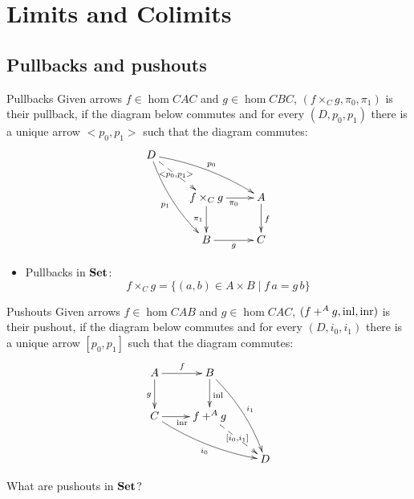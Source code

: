 \documentclass[handout]{beamer}
\begin{document}

\section{Limits and Colimits}

\subsection{Pullbacks and pushouts}

\begin{frame}{}
  \begin{block}{Pullbacks}
    Given arrows $f \in \hom{C}{A}{C}$ and $g \in \hom{C}{B}{C}$,
  $(f\times_C g,\pi_0,\pi_1)$ is their pullback, if 
  the diagram below commutes and for every $(D,p_0,p_1)$ there
  is a unique arrow $<p_0,p_1>$ such that the diagram commutes:
  \[\xymatrix{
    D \ar@/_/[ddr]_{p_1} \ar@/^/[drr]^{p_0} 
    \ar@{-->}[dr] |(.45){<p_0,p_1>} \\ 
    & f \times_C g \ar[r]_{\pi_0}\ar[d]_{\pi_1} & A \ar[d]^f \\
    & B \ar[r]_g & C}\]
  \end{block}

  \begin{itemize}
  \item Pullbacks in $\mathbf{Set}$:
    \[ f \times_C g = \{ (a,b) \in A\times B \mid f\,a = g\,b \}\]
  \end{itemize}

\end{frame}



\begin{frame}{}
  \begin{block}{Pushouts}
    Given arrows $f \in \hom{C}{A}{B}$ and $g \in \hom{C}{A}{C}$,
    $(f+^A g,\mathrm{inl},\mathrm{inr})$ is their pushout, if 
    the diagram below commutes and for every $(D,i_0,i_1)$ there
    is a unique arrow $[p_0,p_1]$ such that the diagram commutes:
    \[\xymatrix{
      A \ar[r]^f \ar[d]_g & B \ar[d]^{\inl} \ar@/^/[ddr]^{i_1} \\
      C \ar[r]_\inr \ar@/_/[drr]_{i_0} & f +^A g \ar@{-->}[dr] |{[i_0,i_1]} \\
      && D}\]
  \end{block}

  \begin{exercise}
    What are pushouts in $\mathbf{Set}$?
  \end{exercise}

\end{frame}
\end{document}
